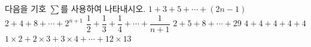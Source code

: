 다음을 기호 $\sum$를 사용하여 나타내시오.
 $1+3+5+\cdots+(2n-1)$
 $2+4+8+\cdots+2^{n+1}$
 $\dfrac{1}{2}+\dfrac{1}{3}+\dfrac{1}{4}+\cdots+\dfrac{1}{n+1}$
 $2+5+8+\cdots+29$
 $4+4+4+4+4$
 $1\times2+2\times3+3\times4+\cdots+12\times13$
